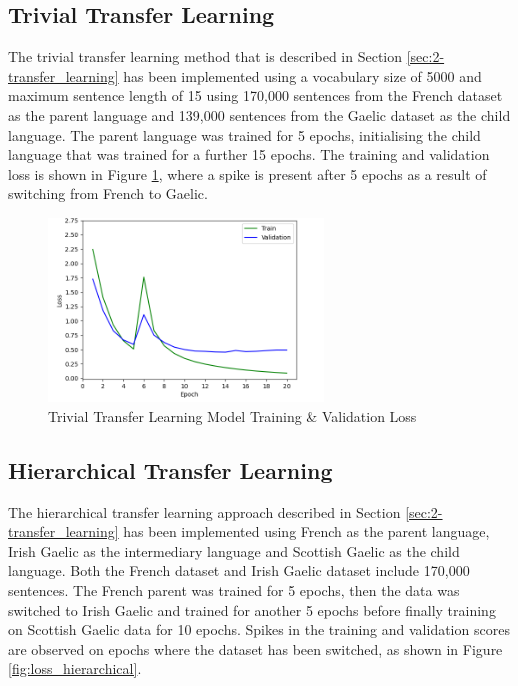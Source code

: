 
\subsection{Trivial Transfer Learning}
\label{sec:4-trivial}

The trivial transfer learning method that is described in Section \ref{sec:2-transfer_learning} has been implemented using a vocabulary size of 5000 and maximum sentence length of 15 using 170,000 sentences from the French dataset as the parent language and 139,000 sentences from the Gaelic dataset as the child language. The parent language was trained for 5 epochs, initialising the child language that was trained for a further 15 epochs. The training and validation loss is shown in Figure \ref{fig:loss_trivial}, where a spike is present after 5 epochs as a result of switching from French to Gaelic.

\begin{figure}[ht!]
\centering
\includegraphics[width=0.65\textwidth]{media/experiments/loss/5k/loss_trivial.png}
\captionsetup{justification=centering}
\caption[Baseline Model Training \& Validation Loss]{Trivial Transfer Learning Model Training \& Validation Loss}
\label{fig:loss_trivial}
\end{figure}



\subsection{Hierarchical Transfer Learning}
\label{sec:4-hierarchical}

The hierarchical transfer learning approach described in Section \ref{sec:2-transfer_learning} has been implemented using French as the parent language, Irish Gaelic as the intermediary language and Scottish Gaelic as the child language. Both the French dataset and Irish Gaelic dataset include 170,000 sentences. The French parent was trained for 5 epochs, then the data was switched to Irish Gaelic and trained for another 5 epochs before finally training on Scottish Gaelic data for 10 epochs. Spikes in the training and validation scores are observed on epochs where the dataset has been switched, as shown in Figure \ref{fig:loss_hierarchical}.


